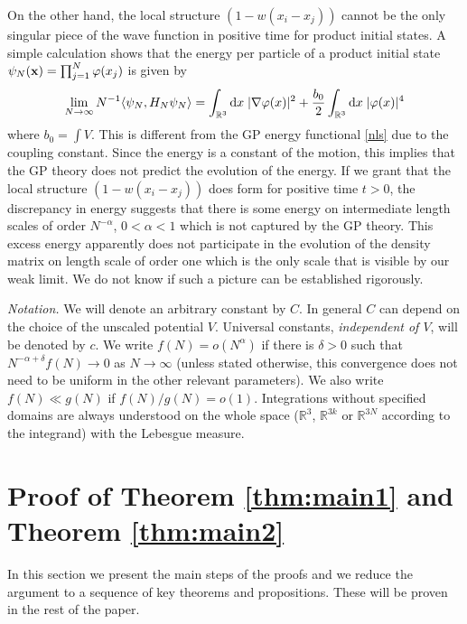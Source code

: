 \documentclass[11pt]{article}
\newcommand{\rd}{{\rm d}}
\newcommand{\bx}{{\bf x}}
\newcommand{\ph}{\varphi}
\newcommand{\bR}{{\mathbb R}}
\begin{document}
On the other hand, the local structure $(1-w(x_i -x_j))$ cannot be
the only singular piece of the wave function in positive time for
product initial states. A simple calculation shows that the energy
per particle
of a product initial state $\psi_N (\bx)= \prod_{j=1}^N \ph
(x_j)$ is given by
\begin{equation}
\lim_{{N\to \infty}}N^{-1}\langle \psi_{N}, H_N \psi_{N} \rangle =
\int_{\bR^3} \rd x \; |\nabla \ph (x)|^{2} + \frac { b_0} 2 \int_{\bR^3}
\rd x \;
|\ph(x)|^{4}
\end{equation}
where  $b_0= \int V$. This is different from the GP energy
functional \eqref{nls} due to the coupling constant. Since the energy is a
constant of the motion, this implies that the GP theory does not
predict the evolution of the energy. If we grant that the local
structure $(1-w(x_i -x_j))$ does form for positive time $t>0$, the
discrepancy in energy suggests that there is some energy on
intermediate length scales of order $N^{-\alpha}$,
$0<\alpha <1$  which is not captured by the GP
theory.  This excess energy apparently does not
participate in the evolution of the density matrix on
length scale of order one which is the only scale that is
visible by our weak limit.
We do not know if such a picture can be established
rigorously.


\medskip


{\it Notation.} We will denote  an arbitrary constant by $C$. In
general $C$ can depend on the choice of the unscaled potential $V$.
Universal constants, {\it independent of $V$}, will be denoted by
$c$. We write $f(N) = o(N^{\alpha})$ if there is $\delta>0$ such
that $N^{-\alpha +\delta} f(N) \to 0$ as $N \to \infty$ (unless
stated otherwise, this convergence does not need to be uniform in
the other relevant parameters). We also write $f(N) \ll g(N)$ if
$f(N)/g(N) = o(1)$. Integrations without specified domains are
always understood on the whole space ($\bR^3$, $\bR^{3k}$ or
$\bR^{3N}$ according to the integrand) with the Lebesgue measure.




\section{Proof of Theorem \ref{thm:main1} and Theorem \ref{thm:main2}}
\label{sec:outline}
\setcounter{equation}{0}



In this section we present the main steps of the proofs and we
reduce the argument to a sequence of key theorems and propositions.
These will be proven in the rest of the paper.
\end{document}
